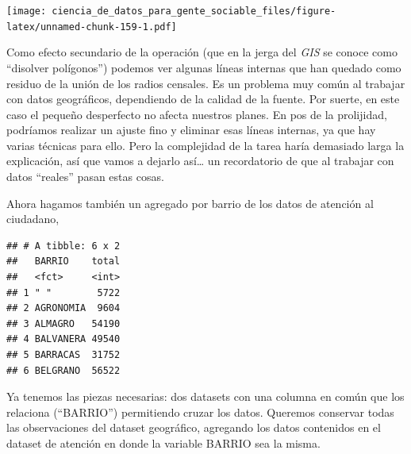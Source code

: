 \documentclass[]{book}
\newenvironment{Shaded}{\begin{snugshade}}{\end{snugshade}}
\newcommand{\KeywordTok}[1]{\textcolor[rgb]{0.13,0.29,0.53}{\textbf{#1}}}
\newcommand{\DataTypeTok}[1]{\textcolor[rgb]{0.13,0.29,0.53}{#1}}
\newcommand{\StringTok}[1]{\textcolor[rgb]{0.31,0.60,0.02}{#1}}
\newcommand{\OperatorTok}[1]{\textcolor[rgb]{0.81,0.36,0.00}{\textbf{#1}}}
\newcommand{\NormalTok}[1]{#1}
\begin{document}
\texttt{[image: ciencia\_de\_datos\_para\_gente\_sociable\_files/figure-latex/unnamed-chunk-159-1.pdf]}

Como efecto secundario de la operación (que en la jerga del \emph{GIS}
se conoce como ``disolver polígonos'') podemos ver algunas líneas
internas que han quedado como residuo de la unión de los radios
censales. Es un problema muy común al trabajar con datos geográficos,
dependiendo de la calidad de la fuente. Por suerte, en este caso el
pequeño desperfecto no afecta nuestros planes. En pos de la prolijidad,
podríamos realizar un ajuste fino y eliminar esas líneas internas, ya
que hay varias técnicas para ello. Pero la complejidad de la tarea haría
demasiado larga la explicación, así que vamos a dejarlo así\ldots{} un
recordatorio de que al trabajar con datos ``reales'' pasan estas cosas.

Ahora hagamos también un agregado por barrio de los datos de atención al
ciudadano,

\begin{Shaded}
\end{Shaded}

\begin{verbatim}
## # A tibble: 6 x 2
##   BARRIO    total
##   <fct>     <int>
## 1 " "        5722
## 2 AGRONOMIA  9604
## 3 ALMAGRO   54190
## 4 BALVANERA 49540
## 5 BARRACAS  31752
## 6 BELGRANO  56522
\end{verbatim}

Ya tenemos las piezas necesarias: dos datasets con una columna en común
que los relaciona (``BARRIO'') permitiendo cruzar los datos. Queremos
conservar todas las observaciones del dataset geográfico, agregando los
datos contenidos en el dataset de atención en donde la variable BARRIO
sea la misma.

\begin{Shaded}
\end{Shaded}
\end{document}

